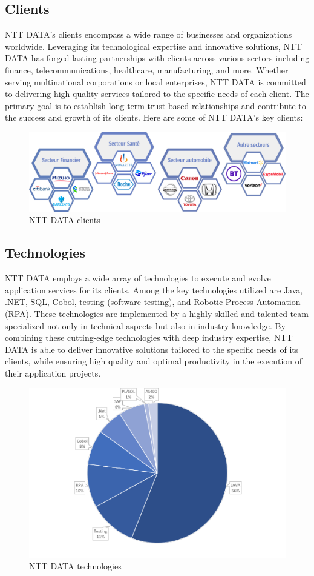 \pagebreak
\subsection{Clients}

NTT DATA's clients encompass a wide range of businesses and organizations worldwide. Leveraging its technological expertise and innovative solutions, NTT DATA has forged lasting partnerships with clients across various sectors including finance, telecommunications, healthcare, manufacturing, and more. Whether serving multinational corporations or local enterprises, NTT DATA is committed to delivering high-quality services tailored to the specific needs of each client. The primary goal is to establish long-term trust-based relationships and contribute to the success and growth of its clients. Here are some of NTT DATA's key clients:


\begin{figure}[h!]
	\centering
	\includegraphics[width=0.8\linewidth]{Image/nttclients.png}
	\caption{NTT DATA clients}
	\label{fig:NTT DATA clients}
\end{figure}


\subsection{Technologies}


NTT DATA employs a wide array of technologies to execute and evolve application services for its clients. Among the key technologies utilized are Java, .NET, SQL, Cobol, testing (software testing), and Robotic Process Automation (RPA). These technologies are implemented by a highly skilled and talented team specialized not only in technical aspects but also in industry knowledge. By combining these cutting-edge technologies with deep industry expertise, NTT DATA is able to deliver innovative solutions tailored to the specific needs of its clients, while ensuring high quality and optimal productivity in the execution of their application projects.

\begin{figure}[h!]
	\centering
	\includegraphics[width=0.65\linewidth]{Image/ntttechnologies.png}
	\caption{NTT DATA technologies}
	\label{fig:NTT DATA technologies}
\end{figure}

